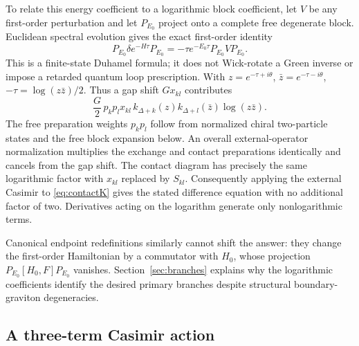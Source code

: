 \documentclass[11pt,a4paper]{article}
\numberwithin{equation}{section}
\theoremstyle{remark}\newtheorem{remark}[theorem]{Remark}
\begin{document}
To relate this energy coefficient to a logarithmic block coefficient, let $V$ be any first-order perturbation and let $P_{E_0}$ project onto a complete free degenerate block. Euclidean spectral evolution gives the exact first-order identity
\begin{equation}
 P_{E_0}\delta e^{-H\tau}P_{E_0}
 =-\tau e^{-E_0\tau}P_{E_0}VP_{E_0}.
 \label{eq:duhamel}
\end{equation}
This is a finite-state Duhamel formula; it does not Wick-rotate a Green inverse or impose a retarded quantum loop prescription. With $z=e^{-\tau+i\theta}$, $\bar z=e^{-\tau-i\theta}$,
$-\tau=\log(z\bar z)/2$. Thus a gap shift $Gx_{kl}$ contributes
\begin{equation}
 \frac G2\,p_kp_l x_{kl}\,
 k_{\Delta+k}(z)k_{\Delta+l}(\bar z)\log(z\bar z).
 \label{eq:logfactor}
\end{equation}
The free preparation weights $p_kp_l$ follow from normalized chiral two-particle states and the free block expansion below. An overall external-operator normalization multiplies the exchange and contact preparations identically and cancels from the gap shift. The contact diagram has precisely the same logarithmic factor with $x_{kl}$ replaced by $S_{kl}$. Consequently applying the external Casimir to \eqref{eq:contactK} gives the stated difference equation with no additional factor of two. Derivatives acting on the logarithm generate only nonlogarithmic terms.

Canonical endpoint redefinitions similarly cannot shift the answer: they change the first-order Hamiltonian by a commutator with $H_0$, whose projection $P_{E_0}[H_0,F]P_{E_0}$ vanishes. Section~\ref{sec:branches} explains why the logarithmic coefficients identify the desired primary branches despite structural boundary-graviton degeneracies.

\subsection{A three-term Casimir action}
\end{document}
